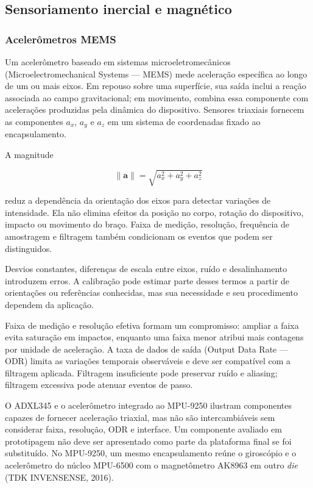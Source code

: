 \documentclass{article}
\begin{document}
\subsection{Sensoriamento inercial e magn\'etico}


\subsubsection{Aceler\^ometros MEMS}


Um aceler\^ometro baseado em sistemas microeletromec\^anicos (Microelectromechanical Systems --- MEMS) mede acelera\c{c}\~ao espec\'ifica ao longo de um ou mais eixos. Em repouso sobre uma superf\'icie, sua sa\'ida inclui a rea\c{c}\~ao associada ao campo gravitacional; em movimento, combina essa componente com acelera\c{c}\~oes produzidas pela din\^amica do dispositivo. Sensores triaxiais fornecem as componentes \(a_x\), \(a_y\) e \(a_z\) em um sistema de coordenadas fixado ao encapsulamento.


A magnitude


\[
\lVert\mathbf{a}\rVert=\sqrt{a_x^2+a_y^2+a_z^2}
\]


reduz a depend\^encia da orienta\c{c}\~ao dos eixos para detectar varia\c{c}\~oes de intensidade. Ela n\~ao elimina efeitos da posi\c{c}\~ao no corpo, rota\c{c}\~ao do dispositivo, impacto ou movimento do bra\c{c}o. Faixa de medi\c{c}\~ao, resolu\c{c}\~ao, frequ\^encia de amostragem e filtragem tamb\'em condicionam os eventos que podem ser distinguidos.


Desvios constantes, diferen\c{c}as de escala entre eixos, ru\'ido e desalinhamento introduzem erros. A calibra\c{c}\~ao pode estimar parte desses termos a partir de orienta\c{c}\~oes ou refer\^encias conhecidas, mas sua necessidade e seu procedimento dependem da aplica\c{c}\~ao.


Faixa de medi\c{c}\~ao e resolu\c{c}\~ao efetiva formam um compromisso: ampliar a faixa evita satura\c{c}\~ao em impactos, enquanto uma faixa menor atribui mais contagens por unidade de acelera\c{c}\~ao. A taxa de dados de sa\'ida (Output Data Rate --- ODR) limita as varia\c{c}\~oes temporais observ\'aveis e deve ser compat\'ivel com a filtragem aplicada. Filtragem insuficiente pode preservar ru\'ido e aliasing; filtragem excessiva pode atenuar eventos de passo.


O ADXL345 e o aceler\^ometro integrado ao MPU-9250 ilustram componentes capazes de fornecer acelera\c{c}\~ao triaxial, mas n\~ao s\~ao intercambi\'aveis sem considerar faixa, resolu\c{c}\~ao, ODR e interface. Um componente avaliado em prototipagem n\~ao deve ser apresentado como parte da plataforma final se foi substitu\'ido. No MPU-9250, um mesmo encapsulamento re\'une o girosc\'opio e o aceler\^ometro do n\'ucleo MPU-6500 com o magnet\^ometro AK8963 em outro \emph{die} (TDK INVENSENSE, 2016).
\end{document}
